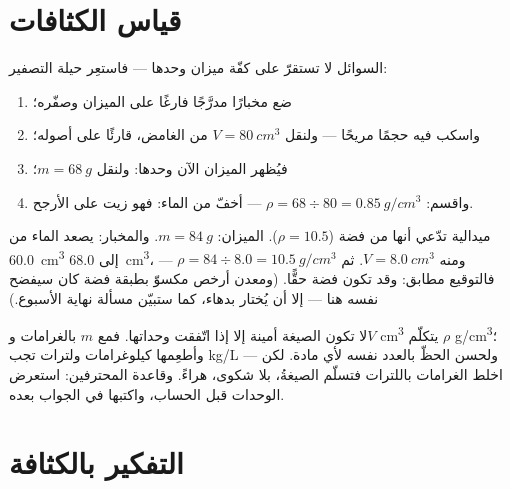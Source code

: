 \section{قياس الكثافات}

\begin{method}\label{met:g7:volume-mass-density:liquid}
السوائل لا تستقرّ على كفّة ميزان وحدها --- فاستعِر حيلة
التصفير:
\begin{enumerate}
  \item ضع مخبارًا مدرَّجًا فارغًا على الميزان وصفّره؛
  \item واسكب فيه حجمًا مريحًا --- ولنقل $V = \qty{80}{cm^3}$
        من  الغامض، قارئًا  على أصوله؛
  \item فيُظهر الميزان الآن   وحدها: ولنقل
        $m = \qty{68}{g}$؛
  \item واقسم: $\rho = 68 \div 80 = \qty{0.85}{g/cm^3}$ ---
        أخفّ من الماء: فهو زيت على الأرجح.
\end{enumerate}
\end{method}

\begin{example}\label{ex:g7:volume-mass-density:solid}
ميدالية تدّعي أنها من فضة ($\rho = 10.5$). الميزان:
$m = \qty{84}{g}$. والمخبار: يصعد الماء من \qty{60.0}{cm^3} إلى
\qty{68.0}{cm^3}، ومنه $V = \qty{8.0}{cm^3}$. ثم
$\rho = 84 \div 8.0 = \qty{10.5}{g/cm^3}$ --- فالتوقيع مطابق:
وقد تكون فضة حقًّا. (ومعدن أرخص مكسوّ بطبقة فضة كان سيفضح نفسه
هنا --- إلا أن يُختار بدهاء، كما ستبيّن مسألة نهاية الأسبوع.)
\end{example}

\begin{remark}\label{rem:g7:volume-mass-density:units}
لا تكون الصيغة أمينة إلا إذا اتّفقت وحداتها. فمع $m$ بالغرامات
و$V$  \unit{cm^3} يتكلّم $\rho$  \unit{g/cm^3}؛ وأطعِمها
كيلوغرامات ولترات تجب  \unit{kg/L} --- ولحسن الحظّ بالعدد
نفسه لأي مادة. لكن اخلط الغرامات باللترات فتسلّم الصيغةُ، بلا
شكوى، هراءً. وقاعدة المحترفين: استعرض الوحدات قبل الحساب،
واكتبها في الجواب بعده.
\end{remark}

\section{التفكير بالكثافة}

